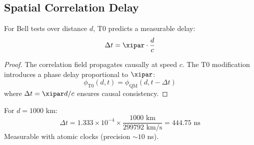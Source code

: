 \begin{table}[h]
	\centering
	\caption{T0 CHSH predictions for multi-qubit systems}
	\label{tab:chsh_predictions}
\end{table}

\subsection{Spatial Correlation Delay}

\begin{proposition}
	For Bell tests over distance $d$, T0 predicts a measurable delay:
	\begin{equation}
		\Delta t = \xipar \cdot \frac{d}{c}
		\label{eq:spatial_delay}
	\end{equation}
\end{proposition}

\begin{proof}
	The correlation field propagates causally at speed $c$. The T0 modification introduces a phase delay proportional to $\xipar$:
	\begin{equation}
		\phi_{\text{T0}}(d, t) = \phi_{\text{QM}}(d, t - \Delta t)
	\end{equation}
	where $\Delta t = \xipar d/c$ ensures causal consistency.
\end{proof}

\begin{experimentbox}
	For $d = 1000$ km:
	\begin{equation}
		\Delta t = 1.333 \times 10^{-4} \times \frac{1000 \text{ km}}{299792 \text{ km/s}} = 444.75 \text{ ns}
	\end{equation}
	Measurable with atomic clocks (precision $\sim 10$ ns).
\end{experimentbox}

